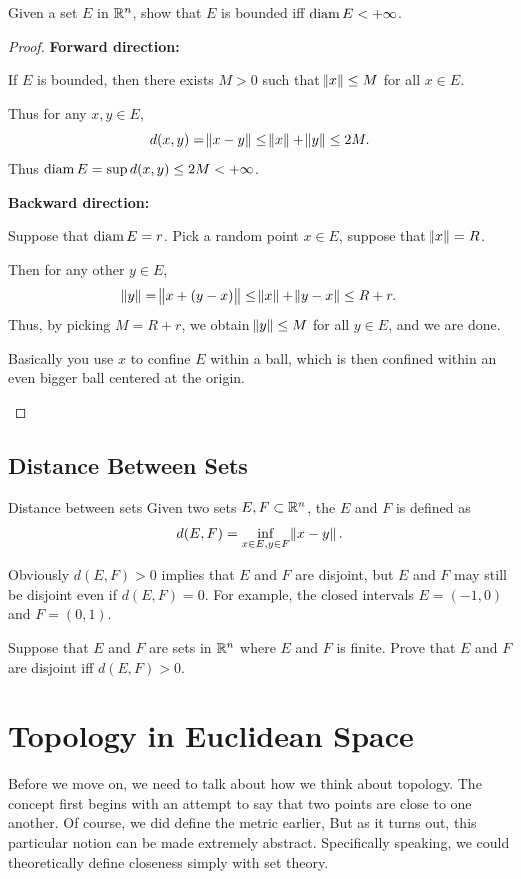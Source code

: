 \begin{exmp}{}{}
Given a set $E$ in $\mathbb R^n$, show that $E$ is bounded iff $\operatorname{diam} E<+\infty$.
\end{exmp}
\begin{proof}
\textbf{Forward direction:}

If $E$ is bounded, then there exists $M>0$ such that $\norm{x}\le M$ for all $x \in E$.

Thus for any $x,y \in E$,
\[ d(x,y)=\norm{x-y}\le\norm{x}+\norm{y}\le2M. \]
Thus $\operatorname{diam} E = \sup d(x,y) \le 2M<+\infty$.

\textbf{Backward direction:}

Suppose that $\operatorname{diam} E=r$. Pick a random point $x \in E$, suppose that $\norm{x}=R$.

Then for any other $y \in E$,
\[ \norm{y}=\norm{x+(y-x)}\le\norm{x}+\norm{y-x}\le R+r. \]
Thus, by picking $M=R+r$, we obtain $\norm{y}\le M$ for all $y \in E$, and we are done.

\begin{remark}
Basically you use $x$ to confine $E$ within a ball, which is then confined within an even bigger ball centered at the origin.
\end{remark}
\end{proof}

\subsection{Distance Between Sets}
\begin{defn}{Distance between sets}{}
Given two sets $E,F\subset\mathbb R^n$, the  $E$ and $F$ is defined as
\[ d(E,F)=\inf_{x\in E,y\in F}\norm{x-y}. \]
\end{defn}

Obviously $d(E,F)>0$ implies that $E$ and $F$ are disjoint, but $E$ and $F$ may still be disjoint even if $d(E,F)=0$. For example, the closed intervals $E=(-1,0)$ and $F=(0,1)$.

\begin{exmp}{}{}
Suppose that $E$ and $F$ are sets in $\mathbb R^n$ where $E$ and $F$ is finite. Prove that $E$ and $F$ are disjoint iff $d(E,F)>0$.
\end{exmp}

\section{Topology in Euclidean Space}
Before we move on, we need to talk about how we think about topology. The concept first begins with an attempt to say that two points are close to one another. Of course, we did define the metric earlier, But as it turns out, this particular notion can be made extremely abstract. Specifically speaking, we could theoretically define closeness simply with set theory.


